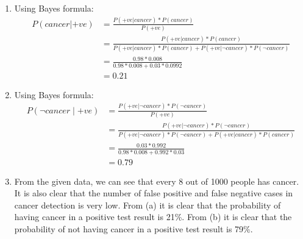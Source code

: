 \begin{enumerate}
    \item Using Bayes formula:
    \begin{align*}
       P(cancer | +ve) &= \frac{P(+ve | cancer) \ast P(cancer)}{P(+ve)} \\[10pt]
                        &= \frac{P(+ve | cancer) \ast P(cancer)}{P(+ve | cancer) \ast P(cancer)+P(+ve | \neg cancer) \ast P(\neg cancer)} \\[10pt]
                        &= \frac{0.98 * 0.008}{0.98 * 0.008 + 0.03 * 0.0992} \\[10pt]
                        &= 0.21 
    \end{align*}

    \item Using Bayes formula: \\
    \begin{align*}
        P(\neg cancer\mid+ve)   &=  \frac{P(+ve | \neg  cancer) \ast P(\neg cancer)}{P(+ve)} \\[10pt]
                                &= \frac{P(+ve | \neg  cancer) \ast P(\neg cancer)}{P(+ve | \neg cancer) \ast P(\neg cancer)+P(+ve | cancer) \ast P(cancer)} \\[10pt]
                                &= \frac{0.03 * 0.992}{0.98 * 0.008 + 0.992*0.03} \\[10pt]
                                &= 0.79
    \end{align*}

    \item From the given data, we can see that every 8 out of 1000 people has cancer. It is also clear that the number of false positive and false negative cases in cancer detection is very low. From (a) it is clear that the probability of having cancer in a positive test result is 21\%. From (b) it is clear that the probability of not having cancer in a positive test result is 79\%. \\
\end{enumerate} 